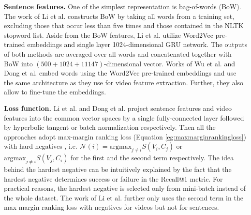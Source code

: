 \begin{description}[labelwidth=1em, leftmargin=!]
    \item \textbf{Sentence features.} One of the simplest representation is bag-of-words (BoW). The work of Li et al. constructs BoW by taking all words from a training set, excluding those that occur less than five times and those contained in the NLTK stopword list. Aside from the BoW features, Li et al. utilize Word2Vec pre-trained embeddings and single layer 1024-dimensional GRU network. The outputs of both methods are averaged over all words and concatenated together with BoW into $(500+1024+11147)$-dimensional vector. %
    Works of Wu et al. and Dong et al. embed words using the Word2Vec pre-trained embeddings and use the same architecture as they use for video feature extraction. Further, they also allow to fine-tune the embeddings.
    
    \item \textbf{Loss function.} Li et al. and Dong et al. project sentence features and video features into the common vector spaces by a single fully-connected layer followed by hyperbolic tangent or batch normalization respectively. Then all the approaches adopt max-margin ranking loss (Equation \ref{eg:maxmarginrankingloss}) with hard negatives \cite{VSEpp}, i.e. $\mathcal{N}(i)=\textrm{argmax}_{j\neq i} S(V_i, C_j)$ or $\textrm{argmax}_{j\neq i} S(V_j, C_i)$ for the first and the second term respectively. The idea behind the hardest negative can be intuitively explained by the fact that the hardest negative determines success or failure in the Recall@1 metric. For practical reasons, the hardest negative is selected only from mini-batch instead of the whole dataset. The work of Li et al. further only uses the second term in the max-margin ranking loss with negatives for videos but not for sentences.
\end{description}



\clearpage
